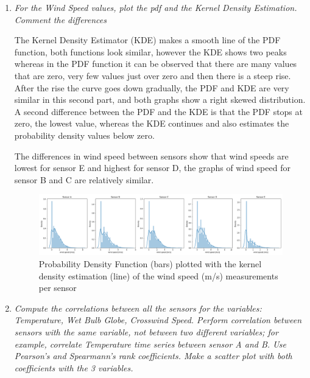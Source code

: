 \documentclass[a4paper,12pt]{article} %
\begin{document}
\begin{enumerate}
\item {\it For the Wind Speed values, plot the pdf and the Kernel Density Estimation. Comment the differences}

The Kernel Density Estimator (KDE) makes a smooth line of the PDF function, both functions look similar, however the KDE shows two peaks whereas in the PDF function it can be observed that there are many values that are zero, very few values just over zero and then there is a steep rise. After the rise the curve goes down gradually, the PDF and KDE are very similar in this second part, and both graphs show a right skewed distribution. A second difference between the PDF and the KDE is that the PDF stops at zero, the lowest value, whereas the KDE continues and also estimates the probability density values below zero.

The differences in wind speed between sensors show that wind speeds are lowest for sensor E and highest for sensor D, the graphs of wind speed for sensor B and C are relatively similar.  

 \begin{figure}[H] 
	\centering
	\includegraphics[width=1\textwidth]{KDE and PDF of wind speed per sensor.png} 
	\caption{Probability Density Function (bars) plotted with the kernel density estimation (line) of the wind speed (m/s) measurements per sensor} %
	\label{fig:PDF+KDE}
\end{figure} 

\item {\it Compute the correlations between all the sensors for the variables: Temperature, Wet Bulb Globe, Crosswind Speed. Perform correlation between sensors with the same variable, not between two different variables; for example, correlate Temperature time series between sensor A and B. Use Pearson’s and Spearmann’s rank coefficients. Make a scatter plot with both coefficients with the 3 variables.}


\end{enumerate}
\end{document}
